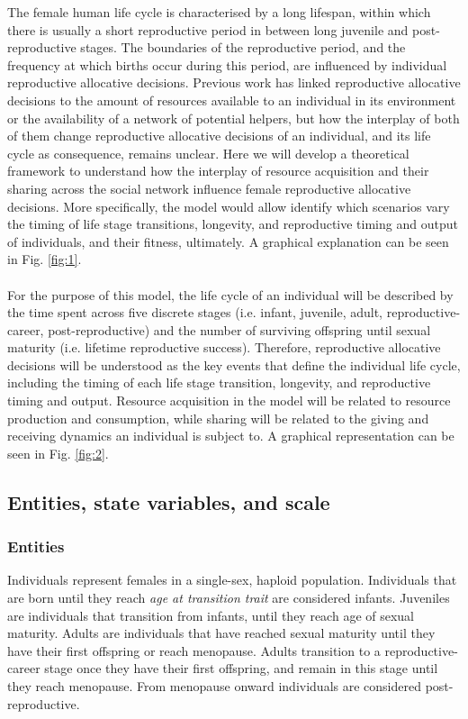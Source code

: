 \documentclass{article}
\begin{document}
The female human life cycle is characterised by a long lifespan, within which there is usually a short reproductive period in between long juvenile and post-reproductive stages. The boundaries of the reproductive period, and the frequency at which births occur during this period, are influenced by individual reproductive allocative decisions. Previous work has linked reproductive allocative decisions to the amount of resources available to an individual in its environment or the availability of a network of potential helpers, but how the interplay of both of them change reproductive allocative decisions of an individual, and its life cycle as consequence, remains unclear. Here we will develop a theoretical framework to understand how the interplay of resource acquisition and their sharing across the social network influence female reproductive allocative decisions. More specifically, the model would allow identify which scenarios vary the timing of life stage transitions, longevity, and reproductive timing and output of individuals, and their fitness, ultimately. A graphical explanation can be seen in Fig. \ref{fig:1}.
\\\\
For the purpose of this model, the life cycle of an individual will be described by the time spent across five discrete stages (i.e. infant, juvenile, adult, reproductive-career, post-reproductive) and the number of surviving offspring until sexual maturity (i.e. lifetime reproductive success). Therefore, reproductive allocative decisions will be understood as the key events that define the individual life cycle, including the timing of each life stage transition, longevity, and reproductive timing and output. Resource acquisition in the model will be related to resource production and consumption, while sharing will be related to the giving and receiving dynamics an individual is subject to. A graphical representation can be seen in Fig. \ref{fig:2}.

\subsection{Entities, state variables, and scale}

\subsubsection{Entities}

Individuals represent females in a single-sex, haploid population. Individuals that are born until they reach \emph{age at transition trait} are considered infants. Juveniles are individuals that transition from infants, until they reach age of sexual maturity. Adults are individuals that have reached sexual maturity until they have their first offspring or reach menopause. Adults transition to a reproductive-career stage once they have their first offspring, and remain in this stage until they reach menopause. From menopause onward individuals are considered post-reproductive.
\end{document}
